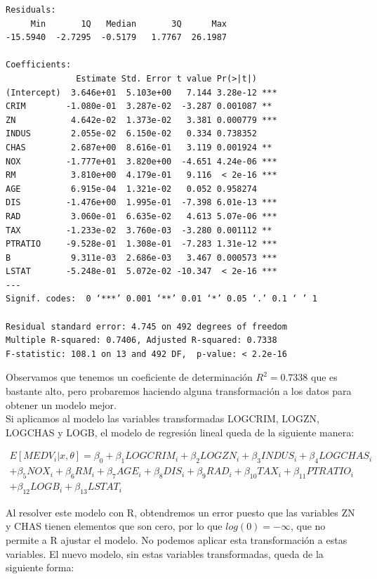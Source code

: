 \documentclass[12pt,a4paper,twoside,openright,titlepage,final]{article}
\begin{document}
\begin{verbatim}
Residuals:
     Min       1Q   Median       3Q      Max 
-15.5940  -2.7295  -0.5179   1.7767  26.1987 

Coefficients:
              Estimate Std. Error t value Pr(>|t|)    
(Intercept)  3.646e+01  5.103e+00   7.144 3.28e-12 ***
CRIM        -1.080e-01  3.287e-02  -3.287 0.001087 ** 
ZN           4.642e-02  1.373e-02   3.381 0.000779 ***
INDUS        2.055e-02  6.150e-02   0.334 0.738352    
CHAS         2.687e+00  8.616e-01   3.119 0.001924 ** 
NOX         -1.777e+01  3.820e+00  -4.651 4.24e-06 ***
RM           3.810e+00  4.179e-01   9.116  < 2e-16 ***
AGE          6.915e-04  1.321e-02   0.052 0.958274    
DIS         -1.476e+00  1.995e-01  -7.398 6.01e-13 ***
RAD          3.060e-01  6.635e-02   4.613 5.07e-06 ***
TAX         -1.233e-02  3.760e-03  -3.280 0.001112 ** 
PTRATIO     -9.528e-01  1.308e-01  -7.283 1.31e-12 ***
B            9.311e-03  2.686e-03   3.467 0.000573 ***
LSTAT       -5.248e-01  5.072e-02 -10.347  < 2e-16 ***
---
Signif. codes:  0 ‘***’ 0.001 ‘**’ 0.01 ‘*’ 0.05 ‘.’ 0.1 ‘ ’ 1 

Residual standard error: 4.745 on 492 degrees of freedom
Multiple R-squared: 0.7406,	Adjusted R-squared: 0.7338 
F-statistic: 108.1 on 13 and 492 DF,  p-value: < 2.2e-16 
\end{verbatim}

Observamos que tenemos un coeficiente de determinación $R^2 = 0.7338$ que es bastante alto, pero probaremos haciendo alguna transformación a los datos para obtener un modelo mejor.\\

Si aplicamos al modelo las variables transformadas LOGCRIM, LOGZN, LOGCHAS y LOGB, el modelo de regresión lineal queda de la siguiente manera:

\begin{multline*}
E[MEDV_i |x, \theta] = \beta_0 + \beta_1 LOGCRIM_i + \beta_2 LOGZN_i + \beta_3 INDUS_i + \beta_4 LOGCHAS_i \\ + \beta_5 NOX_i + \beta_6 RM_i + \beta_7 AGE_i + \beta_8 DIS_i + \beta_9 RAD_i + \beta_{10} TAX_i + \beta_{11} PTRATIO_i \\ + \beta_{12} LOGB_i + \beta_{13} LSTAT_i
\end{multline*}

Al resolver este modelo con R, obtendremos un error puesto que las variables ZN y CHAS tienen elementos que son cero, por lo que $log(0) = -\infty$, que no permite a R ajustar el modelo. No podemos aplicar esta transformación a estas variables. El nuevo modelo, sin estas variables transformadas, queda de la siguiente forma:
\end{document}
